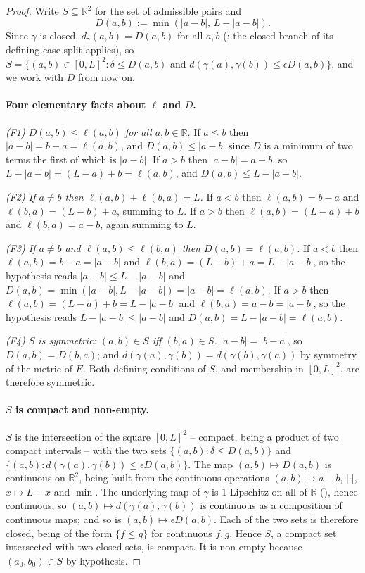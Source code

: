 \begin{proof}
  Write $S \subseteq \mathbb{R}^2$ for the set of admissible pairs and
  \[
    D(a,b) := \min(|a-b|,\, L-|a-b|)
    .
  \]
  Since $\gamma$ is closed, $d_\gamma(a,b) = D(a,b)$ for all $a,b$ (: the closed
  branch of its defining case split applies), so $S = \{(a,b) \in [0,L]^2 : \delta \le D(a,b)
  \text{ and } d(\gamma(a),\gamma(b)) \le \epsilon D(a,b)\}$, and we work with $D$ from now on.

  \paragraph{Four elementary facts about $\ell$ and $D$.}

  \emph{(F1) $D(a,b) \le \ell(a,b)$ for all $a,b \in \mathbb{R}$.} If $a \le b$ then $|a-b| = b-a =
  \ell(a,b)$, and $D(a,b) \le |a-b|$ since $D$ is a minimum of two terms the first of which is
  $|a-b|$. If $a > b$ then $|a-b| = a-b$, so $L - |a-b| = (L-a)+b = \ell(a,b)$, and $D(a,b) \le
  L-|a-b|$.

  \emph{(F2) If $a \ne b$ then $\ell(a,b) + \ell(b,a) = L$.} If $a < b$ then $\ell(a,b) = b-a$ and
  $\ell(b,a) = (L-b)+a$, summing to $L$. If $a > b$ then $\ell(a,b) = (L-a)+b$ and $\ell(b,a) =
  a-b$, again summing to $L$.

  \emph{(F3) If $a \ne b$ and $\ell(a,b) \le \ell(b,a)$ then $D(a,b) = \ell(a,b)$.} If $a < b$ then
  $\ell(a,b) = b-a = |a-b|$ and $\ell(b,a) = (L-b)+a = L-|a-b|$, so the hypothesis reads $|a-b| \le
  L-|a-b|$ and $D(a,b) = \min(|a-b|,L-|a-b|) = |a-b| = \ell(a,b)$. If $a > b$ then $\ell(a,b) =
  (L-a)+b = L-|a-b|$ and $\ell(b,a) = a-b = |a-b|$, so the hypothesis reads $L-|a-b| \le |a-b|$ and
  $D(a,b) = L-|a-b| = \ell(a,b)$.

  \emph{(F4) $S$ is symmetric: $(a,b) \in S$ iff $(b,a) \in S$.} $|a-b| = |b-a|$, so $D(a,b) =
  D(b,a)$; and $d(\gamma(a),\gamma(b)) = d(\gamma(b),\gamma(a))$ by symmetry of the metric of $E$.
  Both defining conditions of $S$, and membership in $[0,L]^2$, are therefore symmetric.

  \paragraph{$S$ is compact and non-empty.} $S$ is the intersection of the square $[0,L]^2$ --
  compact, being a product of two compact intervals -- with the two sets $\{(a,b) : \delta \le
  D(a,b)\}$ and $\{(a,b) : d(\gamma(a),\gamma(b)) \le \epsilon D(a,b)\}$. The map $(a,b) \mapsto
  D(a,b)$ is continuous on $\mathbb{R}^2$, being built from the continuous operations
  $(a,b)\mapsto a-b$, $|\cdot|$, $x \mapsto L-x$ and $\min$. The underlying map of $\gamma$ is
  $1$-Lipschitz on all of $\mathbb{R}$ (), hence continuous, so $(a,b)
  \mapsto d(\gamma(a),\gamma(b))$ is continuous as a composition of continuous maps; and so is
  $(a,b) \mapsto \epsilon D(a,b)$. Each of the two sets is therefore closed, being of the form
  $\{f \le g\}$ for continuous $f,g$. Hence $S$, a compact set intersected with two closed sets, is
  compact. It is non-empty because $(a_0,b_0) \in S$ by hypothesis.


\end{proof}
